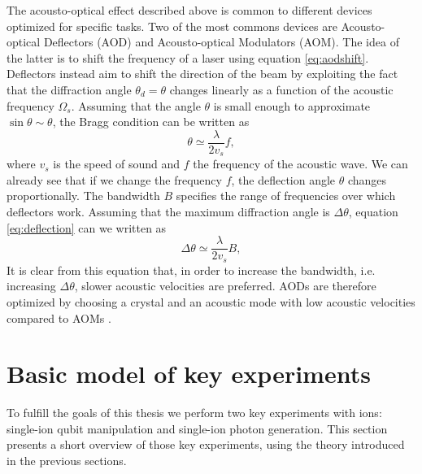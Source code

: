 The acousto-optical effect described above is common to different devices optimized for specific tasks. Two of the most commons devices are Acousto-optical Deflectors (AOD) and Acousto-optical Modulators (AOM). The idea of the latter is to shift the frequency of a laser using equation \eqref{eq:aodshift}. Deflectors instead aim to shift the direction of the beam by exploiting the fact that the diffraction angle $\theta_d = \theta$ changes linearly as a function of the acoustic frequency $\Omega_s$. Assuming that the angle $\theta$ is small enough to approximate $\sin\theta \sim \theta$, the Bragg condition can be written as
\begin{equation}
\label{eq:deflection}
\theta \simeq \frac{\lambda}{2 v_s}f,
\end{equation}
where $v_s$ is the speed of sound and $f$ the frequency of the acoustic wave. We can already see that if we change the frequency $f$, the deflection angle $\theta$ changes proportionally. The bandwidth $B$ specifies the range of frequencies over which deflectors work. Assuming that the maximum diffraction angle is $\Delta\theta$, equation \eqref{eq:deflection} can we written as \cite{Rmer2014}
\begin{equation}
\label{eq:deflection}
\Delta\theta \simeq \frac{\lambda}{2 v_s}B,
\end{equation}
It is clear from this equation that, in order to increase the bandwidth, i.e. increasing $\Delta \theta$, slower acoustic velocities are preferred. AODs are therefore optimized by choosing a crystal and an acoustic mode with low acoustic velocities compared to AOMs \cite{handbookoptics}.%

\section{Basic model of key experiments}
To fulfill the goals of this thesis we perform two key experiments with ions: single-ion qubit manipulation and single-ion photon generation. This section presents a short overview of those key experiments, using the theory introduced in the previous sections.

